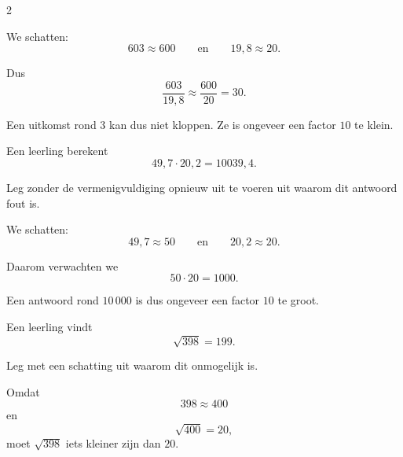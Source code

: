\documentclass{ximera}
\begin{document}
\begin{oefening}{\oefU\ESS}
\begin{multicols}{2}
\begin{question}
                \begin{oplossing}
                We schatten:
                \[
                603\approx600
                \qquad\text{en}\qquad
                19{,}8\approx20.
                \]
                
                Dus
                \[
                \dfrac{603}{19{,}8}
                \approx
                \dfrac{600}{20}
                =30.
                \]
                
                Een uitkomst rond $3$ kan dus niet kloppen. Ze is ongeveer een factor $10$ te klein.
                \end{oplossing}
                \end{question}
                
                
                \begin{question}
                Een leerling berekent
                \[
                49{,}7\cdot20{,}2=10039{,}4.
                \]
                
                Leg zonder de vermenigvuldiging opnieuw uit te voeren uit waarom dit antwoord fout is.
                
                \begin{oplossing}
                We schatten:
                \[
                49{,}7\approx50
                \qquad\text{en}\qquad
                20{,}2\approx20.
                \]
                
                Daarom verwachten we
                \[
                50\cdot20=1000.
                \]
                
                Een antwoord rond $10\,000$ is dus ongeveer een factor $10$ te groot.
                \end{oplossing}
                \end{question}
                
                
                \begin{question}
                Een leerling vindt
                \[
                \sqrt{398}=199.
                \]
                
                Leg met een schatting uit waarom dit onmogelijk is.
                
                \begin{oplossing}
                Omdat
                \[
                398\approx400
                \]
                en
                \[
                \sqrt{400}=20,
                \]
                moet $\sqrt{398}$ iets kleiner zijn dan $20$.
                

\end{oplossing}
\end{question}
\end{multicols}
\end{oefening}
\end{document}
